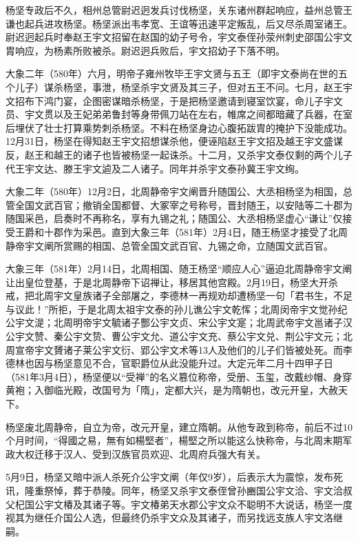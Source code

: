 杨坚专政后不久，相州总管尉迟迥发兵讨伐杨坚，关东诸州群起响应，益州总管王谦也起兵进攻杨坚。杨坚派出韦孝宽、王谊等迅速平定叛乱，后又尽杀周室诸王。尉迟迥起兵时奉赵王宇文招留在赵国的幼子号令，宇文泰侄孙荥州刺史邵国公宇文胄响应，为杨素所败被杀。尉迟迥兵败后，宇文招幼子下落不明。

大象二年（580年）六月，明帝子雍州牧毕王宇文贤与五王（即宇文泰尚在世的五个儿子）谋杀杨坚，事泄，杨坚杀宇文贤及其三子，但对五王不问。七月，赵王宇文招布下鸿门宴，企图密谋暗杀杨坚，于是把杨坚邀请到寝室饮宴，命儿子宇文员、宇文贯以及王妃弟弟鲁封等身带佩刀站在左右，帷席之间都暗藏了兵器，在室后埋伏了壮士打算乘势刺杀杨坚。不料在杨坚身边心腹拓跋胄的掩护下没能成功。12月31日，杨坚在得知赵王宇文招想谋杀他，便诬陷赵王宇文招及越王宇文盛谋反，赵王和越王的诸子也皆被杨坚一起诛杀。十二月，又杀宇文泰仅剩的两个儿子代王宇文达、滕王宇文逌及二人诸子。同年并杀宇文泰孙冀王宇文绚。

大象二年（580年）12月2日，北周静帝宇文阐晋升随国公、大丞相杨坚为相国，总管全国文武百官；撤销全国都督、大冢宰之号称号，晋封随王，以安陆等二十郡为随国采邑，启奏时不再称名，享有九锡之礼；随国公、大丞相杨坚虚心“谦让”仅接受王爵和十郡作为采邑。直到大象三年（581年）2月4日，随王杨坚才接受了北周静帝宇文阐所赏赐的相国、总管全国文武百官、九锡之命，立随国文武百官。

大象三年（581年）2月14日，北周相国、随王杨坚“顺应人心”逼迫北周静帝宇文阐让出皇位登基，于是北周静帝下诏禅让，移居其他宫殿。2月19日，杨坚大开杀戒，把北周宇文皇族诸子全部屠之，李德林一再规劝却遭杨坚一句「君书生，不足与议此！”所拒，于是北周太祖宇文泰的孙儿谯公宇文乾恽；北周闵帝宇文觉孙纪公宇文湜；北周明帝宇文毓诸子酆公宇文贞、宋公宇文寔；北周武帝宇文邕诸子汉公宇文赞、秦公宇文贽、曹公宇文允、道公宇文充、蔡公宇文兑、荆公宇文元；北周宣帝宇文贇诸子莱公宇文衍、郢公宇文术等13人及他们的儿子们皆被处死。而李德林也因与杨坚意见不合，官职爵位从此没能升过。大定元年二月十四甲子日（581年3月4日），杨坚便以“受禅”的名义篡位称帝，受册、玉玺，改戴纱帽、身穿黄袍；入御临光殿，改国号为「隋」，定都大兴，是为隋朝也，改元开皇，大赦天下。

杨坚废北周静帝，自立为帝，改元开皇，建立隋朝。从他专政到称帝，前后不过10个月时间，“得國之易，無有如楊堅者”，楊堅之所以能这么快称帝，与北周末期军政大权迁移于汉人、受到汉族官员欢迎、北周府兵强大有关。

5月9日，杨坚又暗中派人杀死介公宇文阐（年仅9岁），后表示大为震惊，发布死讯，隆重祭悼，葬于恭陵。同年，杨坚又杀宇文泰侄曾孙豳国公宇文洽、宇文洽叔父杞国公宇文椿及其诸子等。宇文椿弟天水郡公宇文众不聪明不大说话，杨坚一度视其为继任介国公人选，但最终仍杀宇文众及其诸子，而另找远支族人宇文洛继嗣。

